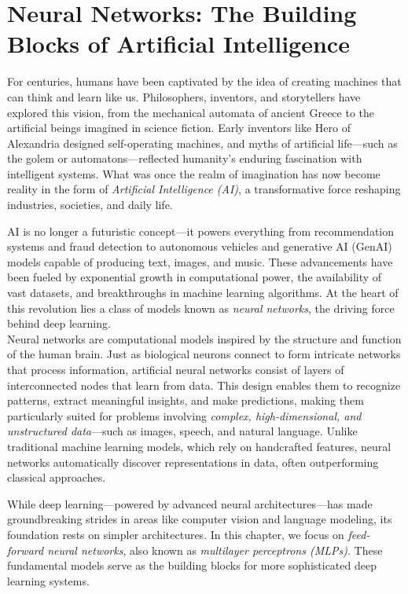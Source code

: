 \documentclass[
  11pt,
]{book}
\theoremstyle{definition}
\theoremstyle{definition}
\theoremstyle{definition}
\theoremstyle{definition}
\theoremstyle{remark}
\begin{document}
\chapter{Neural Networks: The Building Blocks of Artificial Intelligence}\label{chapter-nn}

For centuries, humans have been captivated by the idea of creating machines that can think and learn like us. Philosophers, inventors, and storytellers have explored this vision, from the mechanical automata of ancient Greece to the artificial beings imagined in science fiction. Early inventors like Hero of Alexandria designed self-operating machines, and myths of artificial life---such as the golem or automatons---reflected humanity's enduring fascination with intelligent systems. What was once the realm of imagination has now become reality in the form of \emph{Artificial Intelligence (AI)}, a transformative force reshaping industries, societies, and daily life.

AI is no longer a futuristic concept---it powers everything from recommendation systems and fraud detection to autonomous vehicles and generative AI (GenAI) models capable of producing text, images, and music. These advancements have been fueled by exponential growth in computational power, the availability of vast datasets, and breakthroughs in machine learning algorithms. At the heart of this revolution lies a class of models known as \emph{neural networks}, the driving force behind deep learning.\\
Neural networks are computational models inspired by the structure and function of the human brain. Just as biological neurons connect to form intricate networks that process information, artificial neural networks consist of layers of interconnected nodes that learn from data. This design enables them to recognize patterns, extract meaningful insights, and make predictions, making them particularly suited for problems involving \emph{complex, high-dimensional, and unstructured data}---such as images, speech, and natural language. Unlike traditional machine learning models, which rely on handcrafted features, neural networks automatically discover representations in data, often outperforming classical approaches.

While deep learning---powered by advanced neural architectures---has made groundbreaking strides in areas like computer vision and language modeling, its foundation rests on simpler architectures. In this chapter, we focus on \emph{feed-forward neural networks}, also known as \emph{multilayer perceptrons (MLPs)}. These fundamental models serve as the building blocks for more sophisticated deep learning systems.
\end{document}
